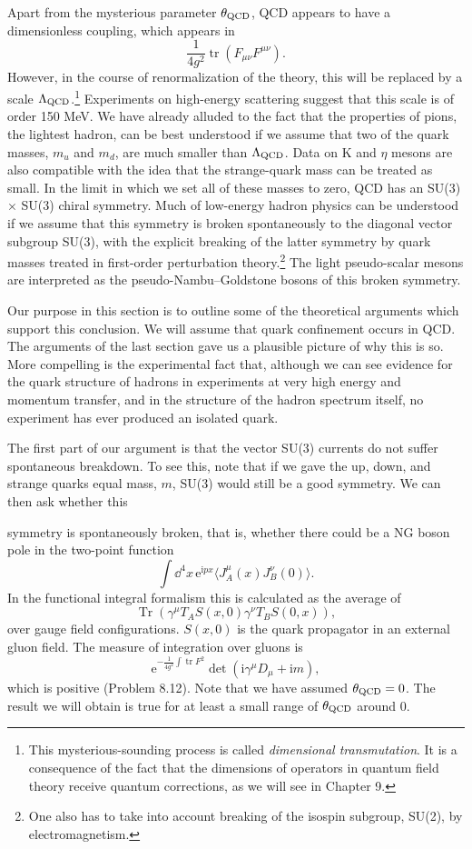 Apart from the mysterious parameter $\theta_{\rm QCD}$, QCD appears to have a
dimensionless coupling, which appears in
\[
  \frac{1}{4g^2}\operatorname{tr}(F_{\mu\nu}F^{\mu\nu}) .
\]
However, in the course of renormalization of the theory, this will be replaced
by a scale $\Lambda_{\rm QCD}$.\footnote[13]{This mysterious-sounding process
is called \emph{dimensional transmutation}. It is a consequence of the fact
that the dimensions of operators in quantum field theory receive quantum
corrections, as we will see in Chapter 9.} Experiments on high-energy
scattering suggest that this scale is of order 150 MeV. We have already
alluded to the fact that the properties of pions, the lightest hadron, can be
best understood if we assume that two of the quark masses, $m_u$ and $m_d$,
are much smaller than $\Lambda_{\rm QCD}$. Data on K and $\eta$ mesons are
also compatible with the idea that the strange-quark mass can be treated as
small. In the limit in which we set all of these masses to zero, QCD has an
SU(3) $\times$ SU(3) chiral symmetry. Much of low-energy hadron physics can
be understood if we assume that this symmetry is broken spontaneously to the
diagonal vector subgroup SU(3), with the explicit breaking of the latter
symmetry by quark masses treated in first-order perturbation theory.\footnote[14]{One
also has to take into account breaking of the isospin subgroup, SU(2), by
electromagnetism.} The light pseudo-scalar mesons are interpreted as the
pseudo-Nambu--Goldstone bosons of this broken symmetry.

Our purpose in this section is to outline some of the theoretical arguments
which support this conclusion. We will assume that quark confinement occurs in
QCD. The arguments of the last section gave us a plausible picture of why this
is so. More compelling is the experimental fact that, although we can see
evidence for the quark structure of hadrons in experiments at very high energy
and momentum transfer, and in the structure of the hadron spectrum itself, no
experiment has ever produced an isolated quark.

The first part of our argument is that the vector SU(3) currents do not suffer
spontaneous breakdown. To see this, note that if we gave the up, down, and
strange quarks equal mass, $m$, SU(3) would still be a good symmetry. We can
then ask whether this

symmetry is spontaneously broken, that is, whether there could be a NG boson
pole in the two-point function
\[
  \int\!\dd^4x\,\mathrm{e}^{\mathrm{i}px}
  \langle J_A^\mu(x)J_B^\nu(0)\rangle .
\]
In the functional integral formalism this is calculated as the average of
\[
  \operatorname{Tr}(\gamma^\mu T_A S(x,0)\gamma^\nu T_B S(0,x)),
\]
over gauge field configurations. $S(x,0)$ is the quark propagator in an
external gluon field. The measure of integration over gluons is
\[
  \mathrm{e}^{-\frac{1}{4g^2}\int\operatorname{tr}F^2}
  \det(\mathrm{i}\gamma^\mu D_\mu+\mathrm{i}m),
\]
which is positive (Problem 8.12). Note that we have assumed
$\theta_{\rm QCD}=0$. The result we will obtain is true for at least a small
range of $\theta_{\rm QCD}$ around 0.

